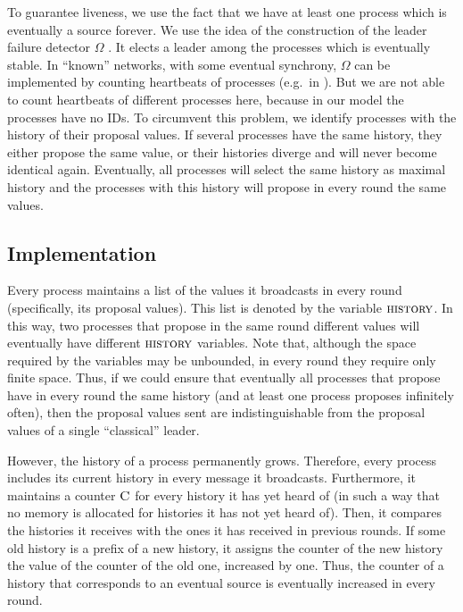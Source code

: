 \documentclass[conference, compsoc]{IEEEtran}
\def\history{\textsc{history}}
\def\C{\textsc{C}}
\begin{document}
To guarantee liveness, we use the fact that we have at least one process which is eventually a source forever. We use the idea of the construction of the leader failure detector $\Omega$ \cite{journals/jacm/ChandraHT96}. It elects a leader among the processes which is eventually stable. In ``known'' networks, with some eventual synchrony, $\Omega$ can be implemented by counting heartbeats of processes (e.g.~in \cite{872081}). But we are not able to count heartbeats of different processes here, because in our model the processes have no IDs. To circumvent this problem, we identify processes with the history of their proposal values. If several processes have the same history, they either propose the same value, or their histories diverge and will never become identical again. Eventually, all processes will select the same history as maximal history and the processes with this history will propose in every round the same values. 

\subsection{Implementation}

Every process maintains a list of the values it broadcasts in every round (specifically, its proposal values). This list is denoted by the variable $\history$. In this way, two processes that propose in the same round different values will eventually have different $\history$ variables. Note that, although the space required by the variables may be unbounded, in every round they require only finite space. Thus, if we could ensure that eventually all processes that propose have in every round the same history (and at least one process proposes infinitely often), then the proposal values sent are indistinguishable from the proposal values of a single ``classical'' leader.

However, the history of a process permanently grows. Therefore, every process includes its current history in every message it broadcasts. Furthermore, it maintains a counter $\C$ for every history it has yet heard of (in such a way that no memory is allocated for histories it has not yet heard of). Then, it compares the histories it receives with the ones it has received in previous rounds. If some old history is a prefix of a new history, it assigns the counter of the new history the value of the counter of the old one, increased by one. Thus, the counter of a history that corresponds to an eventual source is eventually increased in every round. 
\end{document}
